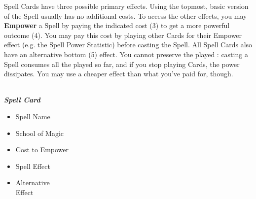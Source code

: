\clearpage
\begin{multicols*}{2}

Spell Cards have three possible primary effects.
Using the topmost, basic version of the Spell usually has no additional costs.
To access the other effects, you may \textbf{Empower} a Spell by paying the indicated cost (3) to get a more powerful outcome (4).
You may pay this cost by playing other Cards for their Empower  effect (e.g. the Spell Power Statistic) before casting the Spell.
All Spell Cards also have an alternative bottom (5)  effect.
You cannot preserve the played : casting a Spell consumes all the  played so far, and if you stop playing Cards, the power dissipates.
You may use a cheaper  effect than what you've paid for, though.\par

{
  \centering
  \\
  \medskip
  \footnotesize
  \textbf{\textit{\textcolor{darkcandyapplered}{Spell Card}}}\par

  \noindent
  \begin{minipage}[t]{0.5\linewidth}
    \begin{itemize}[itemsep=0pt, parsep=5pt, topsep=0pt, partopsep=0pt]
      \item[\textbf{1.}] Spell Name
      \item[\textbf{2.}] School of Magic
      \item[\textbf{3.}] Cost to Empower
    \end{itemize}
  \end{minipage}
  \begin{minipage}[t]{0.4\linewidth}
    \begin{itemize}[itemsep=0pt, parsep=5pt, topsep=0pt, partopsep=0pt]
      \item[\textbf{4.}] Spell Effect
      \item[\textbf{5.}] Alternative\\Effect
    \end{itemize}
  \end{minipage}
}
\medskip


\end{multicols*}

